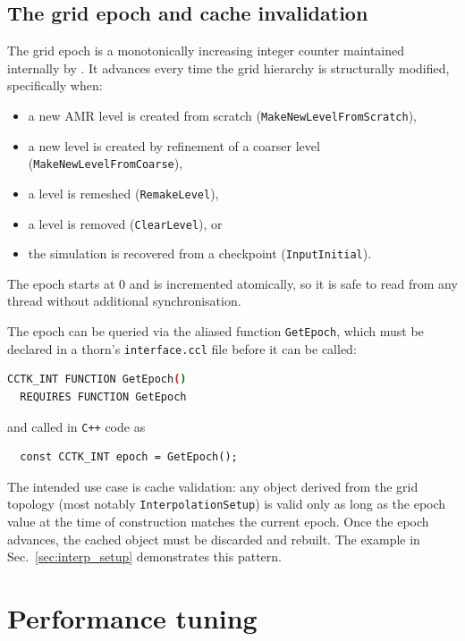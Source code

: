 \subsection{The grid epoch and cache invalidation}
\label{sec:epoch}

The grid epoch is a monotonically increasing integer counter maintained internally by \CarpetX. It advances every time the grid hierarchy is structurally modified, specifically when:
%
\begin{itemize}
  \item a new AMR level is created from scratch (\texttt{MakeNewLevelFromScratch}),
  \item a new level is created by refinement of a coarser level (\texttt{MakeNewLevelFromCoarse}),
  \item a level is remeshed (\texttt{RemakeLevel}),
  \item a level is removed (\texttt{ClearLevel}), or
  \item the simulation is recovered from a checkpoint (\texttt{InputInitial}).
\end{itemize}
%
The epoch starts at 0 and is incremented atomically, so it is safe to read from any thread without additional synchronisation.

The epoch can be queried via the aliased function \texttt{GetEpoch}, which must be declared in a thorn's \texttt{interface.ccl} file before it can be called:

\begin{lstlisting}[language=bash]
  CCTK_INT FUNCTION GetEpoch()
  REQUIRES FUNCTION GetEpoch
\end{lstlisting}

and called in \texttt{C++} code as

\begin{lstlisting}
  const CCTK_INT epoch = GetEpoch();
\end{lstlisting}

The intended use case is cache validation: any object derived from the grid topology (most notably \texttt{InterpolationSetup}) is valid only as long as the epoch value at the time of construction matches the current epoch. Once the epoch advances, the cached object must be discarded and rebuilt. The example in Sec.~\ref{sec:interp_setup} demonstrates this pattern.

\section{Performance tuning}
\label{sec:perf_tuning}


